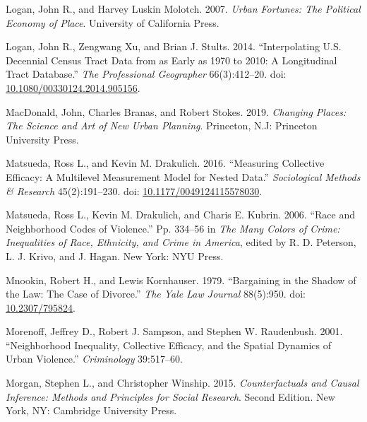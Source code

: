 \documentclass [11pt, proquest] {uwthesis}[2015/03/03]
\newlength{\cslhangindent}
\newenvironment{CSLReferences}[2]%
{\setlength{\parindent}{0pt}%
\everypar{\setlength{\hangindent}{\cslhangindent}}\ignorespaces}%
{\par}
\begin{document}
\begin{CSLReferences}{1}{0}
\leavevmode\hypertarget{ref-loganUrbanFortunesPolitical2007}{}%
Logan, John R., and Harvey Luskin Molotch. 2007. \emph{Urban {Fortunes}: {The Political Economy} of {Place}}. {University of California Press}.

\leavevmode\hypertarget{ref-loganInterpolatingDecennialCensus2014}{}%
Logan, John R., Zengwang Xu, and Brian J. Stults. 2014. {``Interpolating {U}.{S}. {Decennial Census Tract Data} from as {Early} as 1970 to 2010: {A Longitudinal Tract Database}.''} \emph{The Professional Geographer} 66(3):412--20. doi: \href{https://doi.org/10.1080/00330124.2014.905156}{10.1080/00330124.2014.905156}.

\leavevmode\hypertarget{ref-macdonaldChangingPlacesScience2019}{}%
MacDonald, John, Charles Branas, and Robert Stokes. 2019. \emph{Changing {Places}: {The Science} and {Art} of {New Urban Planning}}. {Princeton, N.J}: {Princeton University Press}.

\leavevmode\hypertarget{ref-matsuedaMeasuringCollectiveEfficacy2016}{}%
Matsueda, Ross L., and Kevin M. Drakulich. 2016. {``Measuring {Collective Efficacy}: {A Multilevel Measurement Model} for {Nested Data}.''} \emph{Sociological Methods \& Research} 45(2):191--230. doi: \href{https://doi.org/10.1177/0049124115578030}{10.1177/0049124115578030}.

\leavevmode\hypertarget{ref-matsuedaRaceNeighborhoodCodes2006}{}%
Matsueda, Ross L., Kevin M. Drakulich, and Charis E. Kubrin. 2006. {``Race and {Neighborhood Codes} of {Violence}.''} Pp. 334--56 in \emph{The {Many Colors} of {Crime}: {Inequalities} of {Race}, {Ethnicity}, and {Crime} in {America}}, edited by R. D. Peterson, L. J. Krivo, and J. Hagan. {New York}: {NYU Press}.

\leavevmode\hypertarget{ref-mnookinBargainingShadowLaw1979}{}%
Mnookin, Robert H., and Lewis Kornhauser. 1979. {``Bargaining in the {Shadow} of the {Law}: {The Case} of {Divorce}.''} \emph{The Yale Law Journal} 88(5):950. doi: \href{https://doi.org/10.2307/795824}{10.2307/795824}.

\leavevmode\hypertarget{ref-morenoffNeighborhoodInequalityCollective2001}{}%
Morenoff, Jeffrey D., Robert J. Sampson, and Stephen W. Raudenbush. 2001. {``Neighborhood {Inequality}, {Collective Efficacy}, and the {Spatial Dynamics} of {Urban Violence}.''} \emph{Criminology} 39:517--60.

\leavevmode\hypertarget{ref-morganCounterfactualsCausalInference2015}{}%
Morgan, Stephen L., and Christopher Winship. 2015. \emph{Counterfactuals and {Causal Inference}: {Methods} and {Principles} for {Social Research}}. Second Edition. {New York, NY}: {Cambridge University Press}.


\end{CSLReferences}
\end{document}
